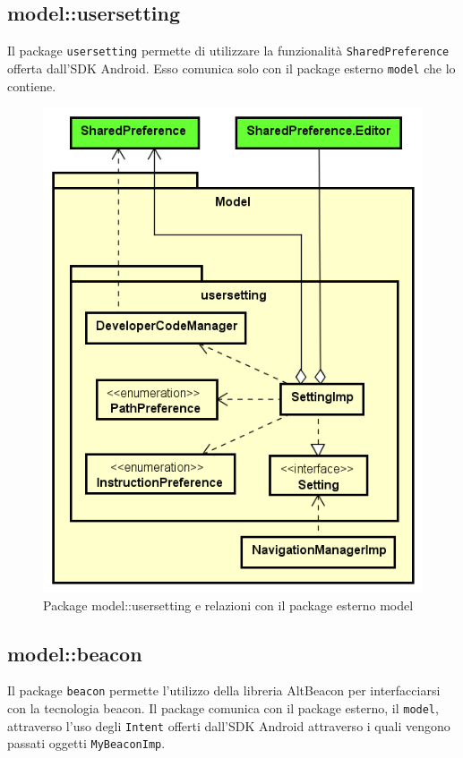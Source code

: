 \documentclass[../DefinizioneDiProdotto.tex,lanscape]{subfiles}
\begin{document}
\newpage

	\subsection{model::usersetting}
		Il package \verb|usersetting| permette di utilizzare la funzionalità \verb|SharedPreference| offerta dall'SDK Android. Esso comunica solo con il package esterno \verb|model| che lo contiene.

\begin{figure}[h]
	\centering
	\includegraphics[scale=0.6]{img/RelationPackage/usersetting}
	\caption{Package model::usersetting e relazioni con il package esterno model}
	\label{usersettingPackage}
\end{figure}


\newpage
	\subsection{model::beacon}
		Il package \verb|beacon| permette l'utilizzo della libreria AltBeacon per interfacciarsi con la tecnologia beacon. Il package comunica con il package esterno, il \verb|model|, attraverso l'uso degli \verb|Intent| offerti dall'SDK Android attraverso i quali vengono passati oggetti \verb|MyBeaconImp|.
\end{document}
